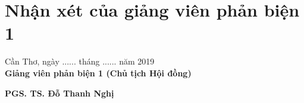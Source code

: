 \chapter*{\centering Nhận xét của giảng viên phản biện 1 }
\vspace{6mm}
\noindent
\begin{flushright}
Cần Thơ, ngày ...... tháng ...... năm 2019 \\
\textbf{Giảng viên phản biện 1 (Chủ tịch Hội đồng)}\\
\end{flushright}
\vspace{12mm}
\begin{flushright}
\textbf{PGS. TS. Đỗ Thanh Nghị}
\end{flushright} 